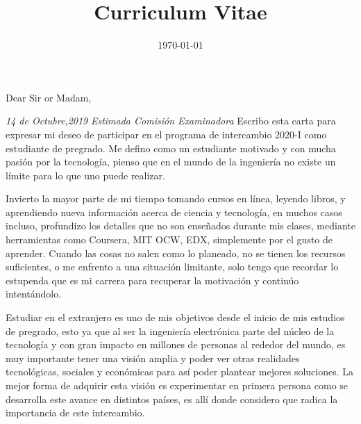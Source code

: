 \documentclass[12pt,a4paper,roman]{moderncv} %
\title{Curriculum Vitae}
\begin{document}


\clearpage

\date{\today} %
\opening{Dear Sir or Madam,} %

\justify
\textit{14 de Octubre,2019}\newline\newline
\textit{Estimada Comisión Examinadora}\newline\newline
Escribo esta carta para expresar mi deseo de participar en el programa de intercambio 2020-I como estudiante de pregrado. Me defino como un estudiante motivado y con mucha pasión por la tecnología, pienso que en el mundo de la ingeniería no existe un límite para lo que uno puede realizar.

Invierto la mayor parte de mi tiempo tomando cursos en línea, leyendo libros, y aprendiendo nueva información acerca de ciencia y tecnología, en muchos casos incluso, profundizo los detalles que no son enseñados durante mis clases, mediante herramientas como Coursera, MIT OCW, EDX, simplemente por el gusto de aprender. Cuando las cosas no salen como lo planeado, no se tienen los recursos suficientes, o me enfrento a una situación limitante, solo tengo que recordar lo estupenda que es mi carrera para recuperar la motivación y continúo intentándolo.

Estudiar en el extranjero es uno de mis objetivos desde el inicio de mis estudios de pregrado, esto ya que al ser la ingeniería electrónica parte del núcleo de la tecnología y con gran impacto en millones de personas al rededor del mundo, es muy importante tener una visión amplia y poder ver otras realidades tecnológicas, sociales y económicas para así poder plantear mejores soluciones. La mejor forma de adquirir esta visión es experimentar en primera persona como se desarrolla este avance en distintos países, es allí donde considero que radica la importancia de este intercambio.
\end{document}

